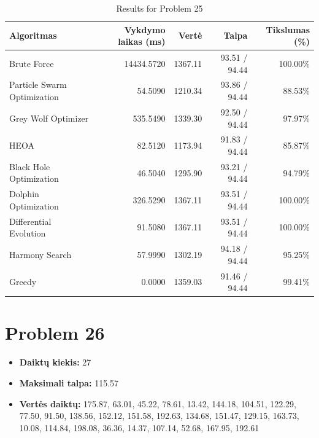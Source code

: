 \documentclass[a4paper,11pt]{article}
\begin{document}
\begin{table}[h!]
\centering
\begin{tabular}{lrrrr}
\toprule
\textbf{Algoritmas} & \textbf{Vykdymo laikas (ms)} & \textbf{Vertė} & \textbf{Talpa} & \textbf{Tikslumas (\%)} \\
\midrule
Brute Force & 14434.5720 & 1367.11 & 93.51 / 94.44 & 100.00\% \\
Particle Swarm Optimization & 54.5090 & 1210.34 & 93.86 / 94.44 & 88.53\% \\
Grey Wolf Optimizer & 535.5490 & 1339.30 & 92.50 / 94.44 & 97.97\% \\
HEOA & 82.5120 & 1173.94 & 91.83 / 94.44 & 85.87\% \\
Black Hole Optimization & 46.5040 & 1295.90 & 93.21 / 94.44 & 94.79\% \\
Dolphin Optimization & 326.5290 & 1367.11 & 93.51 / 94.44 & 100.00\% \\
Differential Evolution & 91.5080 & 1367.11 & 93.51 / 94.44 & 100.00\% \\
Harmony Search & 57.9990 & 1302.19 & 94.18 / 94.44 & 95.25\% \\
Greedy & 0.0000 & 1359.03 & 91.46 / 94.44 & 99.41\% \\
\bottomrule
\end{tabular}
\caption{Results for Problem 25}
\end{table}
\clearpage

\section*{Problem 26}
\begin{itemize}
    \item \textbf{Daiktų kiekis:} 27
    \item \textbf{Maksimali talpa:} 115.57
    \item \textbf{Vertės daiktų:} 175.87, 63.01, 45.22, 78.61, 13.42, 144.18, 104.51, 122.29, 77.50, 91.50, 138.56, 152.12, 151.58, 192.63, 134.68, 151.47, 129.15, 163.73, 10.08, 114.84, 198.08, 36.36, 14.37, 107.14, 52.68, 167.95, 192.61
\end{itemize}
\end{document}
